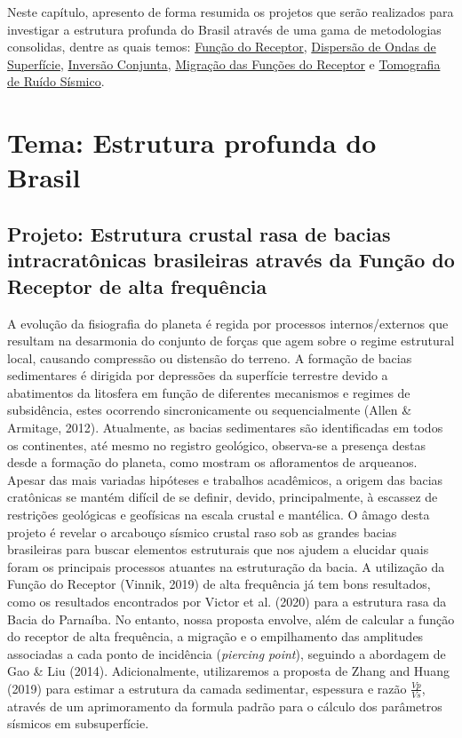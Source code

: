 \documentclass[10pt,a4paper,oneside]{book}
\begin{document}
Neste capítulo, apresento de forma resumida os projetos que serão realizados para investigar a estrutura profunda do Brasil através de uma gama de metodologias consolidas, dentre as quais temos: \href{https://doi.org/10.1029/JB084iB09p04749}{Função do Receptor}, \href{https://doi.org/10.1111/j.1365-246X.1990.tb04573.x}{Dispersão de Ondas de Superfície}, \href{https://doi.org/10.1046/j.1365-246x.2000.00217.x}{Inversão Conjunta}, \href{https://doi.org/10.1016/j.epsl.2013.08.025}{Migração das Funções do Receptor} e \href{https://doi.org/10.1111/j.1365-246X.2007.03374.x}{Tomografia de Ruído Sísmico}.   

\section{Tema: Estrutura profunda do Brasil}

\subsection{Projeto: Estrutura crustal rasa de bacias intracratônicas brasileiras através da Função do Receptor de alta frequência}

A evolução da fisiografia do planeta é regida por processos internos/externos que resultam na desarmonia do conjunto de forças que agem sobre o regime estrutural local, causando compressão ou distensão do terreno. A formação de bacias sedimentares é dirigida por depressões da superfície terrestre devido a abatimentos da litosfera em função de diferentes mecanismos e regimes de subsidência, estes ocorrendo sincronicamente ou sequencialmente (Allen \& Armitage, 2012). Atualmente, as bacias sedimentares são identificadas em todos os continentes, até mesmo no registro geológico, observa-se a presença destas desde a formação do planeta, como mostram os afloramentos de arqueanos. Apesar das mais variadas hipóteses e trabalhos acadêmicos, a origem das bacias cratônicas se mantém difícil de se definir, devido, principalmente, à escassez de restrições geológicas e geofísicas na escala crustal e mantélica. O âmago desta projeto é revelar o arcabouço sísmico crustal raso sob as grandes bacias brasileiras para buscar elementos estruturais que nos ajudem a elucidar quais foram os principais processos atuantes na estruturação da bacia. A utilização da Função do Receptor (Vinnik, 2019) de alta frequência já tem bons resultados, como os resultados encontrados por Victor et al. (2020) para a estrutura rasa da Bacia do Parnaíba. No entanto, nossa proposta envolve, além de calcular a função do receptor de alta frequência, a migração e o empilhamento das amplitudes associadas a cada ponto de incidência (\textit{piercing point}), seguindo a abordagem de Gao \& Liu (2014). Adicionalmente, utilizaremos a proposta de Zhang and Huang (2019) para estimar a estrutura da camada sedimentar, espessura e razão $\frac{Vp}{Vs}$, através de um aprimoramento da formula padrão para o cálculo dos parâmetros sísmicos em subsuperfície.
\end{document}
